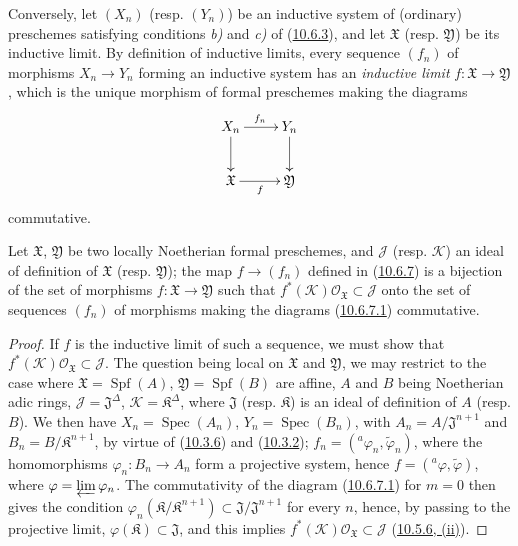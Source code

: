 \begin{env}[10.6.8]
\label{I.10.6.8}
Conversely, let $(X_n)$ (resp. $(Y_n)$) be an inductive system of
(ordinary) preschemes satisfying conditions \emph{b)} and \emph{c)} of
(\hyperref[I.10.6.3]{10.6.3}), and let $\mathfrak{X}$ (resp.
$\mathfrak{Y}$) be its inductive limit. By definition of inductive
limits, every sequence $(f_n)$ of morphisms $X_n\to Y_n$ forming an
inductive system has an \emph{inductive limit}
$f:\mathfrak{X}\to\mathfrak{Y}$, which is the unique morphism of
formal preschemes making the diagrams
\[
  \xymatrix{
    X_n\ar[r]^{f_n}\ar[d] &
    Y_n\ar[d]\\
    \mathfrak{X}\ar[r]_f &
    \mathfrak{Y}
  }
\]
commutative.
\end{env}

\begin{proposition}[10.6.9]
\label{I.10.6.9}
Let $\mathfrak{X}$, $\mathfrak{Y}$ be two locally Noetherian formal
preschemes, and $\mathscr{J}$ \textup{(resp. $\mathscr{K}$)} an ideal
of definition of $\mathfrak{X}$ \textup{(resp. $\mathfrak{Y}$)};
the map $f\to(f_n)$ defined in
\textup{(\hyperref[I.10.6.7]{10.6.7})} is a bijection of the set of
morphisms $f:\mathfrak{X}\to\mathfrak{Y}$ such that
$f^*(\mathscr{K})\mathscr{O}_{\mathfrak{X}}\subset\mathscr{J}$ onto
the set of sequences $(f_n)$ of morphisms making the
diagrams \textup{(\hyperref[I.10.6.7.1]{10.6.7.1})} commutative.
\end{proposition}

\begin{proof}
If $f$ is the inductive limit of such a sequence, we must show that
$f^*(\mathscr{K})\mathscr{O}_{\mathfrak{X}}\subset\mathscr{J}$. The
question being local on $\mathfrak{X}$ and $\mathfrak{Y}$, we may
restrict to the case where $\mathfrak{X}=\operatorname{Spf}(A)$,
$\mathfrak{Y}=\operatorname{Spf}(B)$ are affine, $A$ and $B$ being
Noetherian adic rings,
$\mathscr{J}=\mathfrak{J}^\Delta$,
$\mathscr{K}=\mathfrak{K}^\Delta$, where $\mathfrak{J}$ (resp.
$\mathfrak{K}$) is an ideal of definition of $A$ (resp. $B$). We then
have $X_n=\operatorname{Spec}(A_n)$,
$Y_n=\operatorname{Spec}(B_n)$, with
$A_n=A/\mathfrak{J}^{n+1}$ and $B_n=B/\mathfrak{K}^{n+1}$, by virtue of
(\hyperref[I.10.3.6]{10.3.6}) and
(\hyperref[I.10.3.2]{10.3.2});
$f_n=({}^a\varphi_n,\widetilde{\varphi}_n)$, where the homomorphisms
$\varphi_n:B_n\to A_n$ form a projective system, hence
$f=({}^a\varphi,\widetilde{\varphi})$, where
$\varphi=\varprojlim\varphi_n$. The commutativity of the diagram
(\hyperref[I.10.6.7.1]{10.6.7.1}) for $m=0$ then gives the
condition
$\varphi_n(\mathfrak{K}/\mathfrak{K}^{n+1})
\subset\mathfrak{J}/\mathfrak{J}^{n+1}$ for every $n$, hence, by
passing to the projective limit, $\varphi(\mathfrak{K})\subset
\mathfrak{J}$, and this implies
$f^*(\mathscr{K})\mathscr{O}_{\mathfrak{X}}\subset\mathscr{J}$
(\hyperref[I.10.5.6]{10.5.6, (ii)}).
\end{proof}


